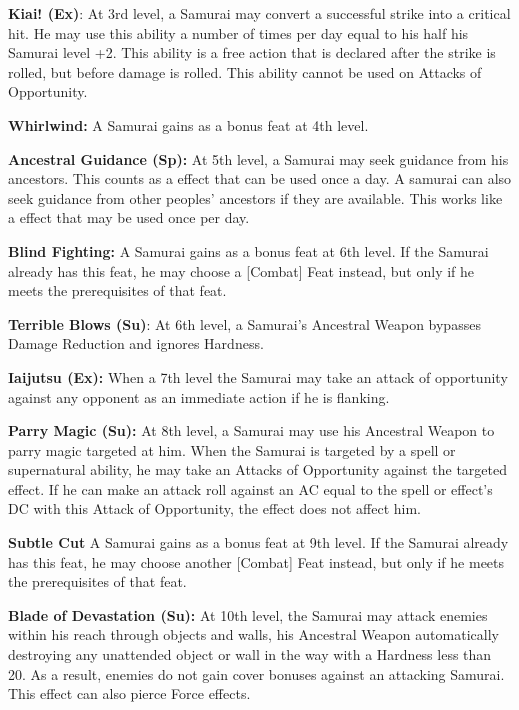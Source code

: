 \textbf{Kiai! (Ex)}: At 3rd level, a Samurai may convert a successful strike into a critical hit. He may use this ability a number of times per day equal to his half his Samurai level +2. This ability is a free action that is declared after the strike is rolled, but before damage is rolled. This ability cannot be used on Attacks of Opportunity.

\textbf{Whirlwind:} A Samurai gains  as a bonus feat at 4th level.

\textbf{Ancestral Guidance (Sp):} At 5th level, a Samurai may seek guidance from his ancestors. This counts as a  effect that can be used once a day. A samurai can also seek guidance from other peoples' ancestors if they are available. This works like a  effect that may be used once per day.

\textbf{Blind Fighting:} A Samurai gains  as a bonus feat at 6th level. If the Samurai already has this feat, he may choose a [Combat] Feat instead, but only if he meets the prerequisites of that feat.

\textbf{Terrible Blows (Su)}: At 6th level, a Samurai's Ancestral Weapon bypasses Damage Reduction and ignores Hardness.

\textbf{Iaijutsu (Ex):} When a 7th level the Samurai may take an attack of opportunity against any opponent as an immediate action if he is flanking. 

\textbf{Parry Magic (Su):} At 8th level, a Samurai may use his Ancestral Weapon to parry magic targeted at him. When the Samurai is targeted by a spell or supernatural ability, he may take an Attacks of Opportunity against the targeted effect. If he can make an attack roll against an AC equal to the spell or effect's DC with this Attack of Opportunity, the effect does not affect him.

\textbf{Subtle Cut} A Samurai gains  as a bonus feat at 9th level. If the Samurai already has this feat, he may choose another [Combat] Feat instead, but only if he meets the prerequisites of that feat.

\textbf{Blade of Devastation (Su):} At 10th level, the Samurai may attack enemies within his reach through objects and walls, his Ancestral Weapon automatically destroying any unattended object or wall in the way with a Hardness less than 20. As a result, enemies do not gain cover bonuses against an attacking Samurai. This effect can also pierce Force effects.

